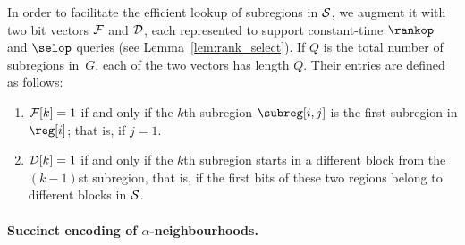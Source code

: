 In order to facilitate the efficient lookup of subregions in $\mathcal{S}$, we augment
it with two bit vectors $\mathcal{F}$ and $\mathcal{D}$, each represented to support
constant-time $\rankop$ and $\selop$ queries (see Lemma~\ref{lem:rank_select}).
If $Q$ is the total number of subregions in~$G$, each of the two vectors has
length $Q$.
Their entries are defined as follows:
\begin{enumerate}
\item $\mathcal{F}[k] = 1$ if and only if the $k$th subregion $\subreg[i,j]$
  is the first subregion in $\reg[i]$; that is, if $j = 1$.
\item $\mathcal{D}[k] = 1$ if and only if the $k$th subregion starts in
  a different block from the $(k-1)$st subregion, that is, if
  the first bits of these two regions belong to different blocks in
  $\mathcal{S}$.
\end{enumerate}

\paragraph{\boldmath Succinct encoding of $\alpha$-neighbourhoods.}

